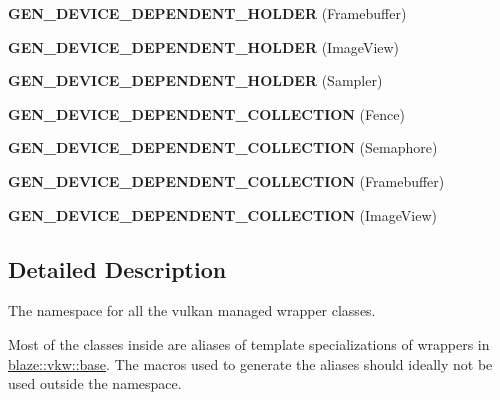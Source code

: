 \begin{DoxyCompactItemize}
{\bfseries G\+E\+N\+\_\+\+D\+E\+V\+I\+C\+E\+\_\+\+D\+E\+P\+E\+N\+D\+E\+N\+T\+\_\+\+H\+O\+L\+D\+ER} (Framebuffer)
\item 
\mbox{\label{namespaceblaze_1_1vkw_aac02f1fb18bb3d0ffbe294ea78800c56}} 
{\bfseries G\+E\+N\+\_\+\+D\+E\+V\+I\+C\+E\+\_\+\+D\+E\+P\+E\+N\+D\+E\+N\+T\+\_\+\+H\+O\+L\+D\+ER} (Image\+View)
\item 
\mbox{\label{namespaceblaze_1_1vkw_a36570187838a0a4a8bf390a1ac965b44}} 
{\bfseries G\+E\+N\+\_\+\+D\+E\+V\+I\+C\+E\+\_\+\+D\+E\+P\+E\+N\+D\+E\+N\+T\+\_\+\+H\+O\+L\+D\+ER} (Sampler)
\item 
\mbox{\label{namespaceblaze_1_1vkw_aedf6704d909b66710934d9833328ef27}} 
{\bfseries G\+E\+N\+\_\+\+D\+E\+V\+I\+C\+E\+\_\+\+D\+E\+P\+E\+N\+D\+E\+N\+T\+\_\+\+C\+O\+L\+L\+E\+C\+T\+I\+ON} (Fence)
\item 
\mbox{\label{namespaceblaze_1_1vkw_a7c1f63b4516af4ee6f7f829701a7c5f5}} 
{\bfseries G\+E\+N\+\_\+\+D\+E\+V\+I\+C\+E\+\_\+\+D\+E\+P\+E\+N\+D\+E\+N\+T\+\_\+\+C\+O\+L\+L\+E\+C\+T\+I\+ON} (Semaphore)
\item 
\mbox{\label{namespaceblaze_1_1vkw_ab2278f8d1de3c89b1305a81993449ddc}} 
{\bfseries G\+E\+N\+\_\+\+D\+E\+V\+I\+C\+E\+\_\+\+D\+E\+P\+E\+N\+D\+E\+N\+T\+\_\+\+C\+O\+L\+L\+E\+C\+T\+I\+ON} (Framebuffer)
\item 
\mbox{\label{namespaceblaze_1_1vkw_a14711365ab3a9df61144961636c67006}} 
{\bfseries G\+E\+N\+\_\+\+D\+E\+V\+I\+C\+E\+\_\+\+D\+E\+P\+E\+N\+D\+E\+N\+T\+\_\+\+C\+O\+L\+L\+E\+C\+T\+I\+ON} (Image\+View)
\end{DoxyCompactItemize}


\subsection{Detailed Description}
The namespace for all the vulkan managed wrapper classes. 

Most of the classes inside are aliases of template specializations of wrappers in \hyperlink{namespaceblaze_1_1vkw_1_1base}{blaze\+::vkw\+::base}. The macros used to generate the aliases should ideally not be used outside the namespace. 